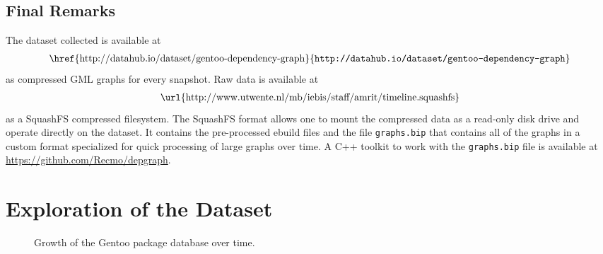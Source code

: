 \documentclass[smallextended,final]{svjour3}
\begin{document}
\subsection{Final Remarks}

The dataset collected is available at
\begin{align}
\mbox{\href{http://datahub.io/dataset/gentoo-dependency-graph}{\texttt{http://datahub.io/dataset/gentoo-dependency-graph}}}
\end{align}
as compressed GML graphs for every snapshot. Raw data is available at
\begin{align}
\mbox{\url{http://www.utwente.nl/mb/iebis/staff/amrit/timeline.squashfs}}
\end{align}
as a SquashFS compressed filesystem. The SquashFS format allows one to mount the compressed data as a read-only disk drive and operate directly on the dataset. It contains the pre-processed ebuild files and the file \verb|graphs.bip| that contains all of the graphs in a custom format specialized for quick processing of large graphs over time. A C++ toolkit to work with the \verb|graphs.bip| file is available at \url{https://github.com/Recmo/depgraph}.

\section{Exploration of the Dataset}

\begin{figure}
\small\centering
{}
\caption{Growth of the Gentoo package database over time.}\label{fig:pkgsgrowth}
\end{figure}
\end{document}
